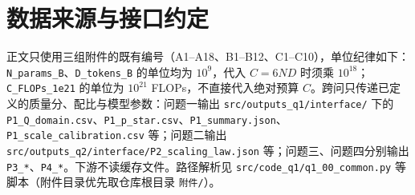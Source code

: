 \section{数据来源与接口约定}
\label{sec:5.1}

正文只使用三组附件的既有编号（A1–A18、B1–B12、C1–C10），单位纪律如下：\texttt{N\_params\_B}、\texttt{D\_tokens\_B} 的单位均为 $10^9$，代入 $C=6ND$ 时须乘 $10^{18}$；\texttt{C\_FLOPs\_1e21} 的单位为 $10^{21}$ FLOPs，不直接代入绝对预算 $C$。跨问只传递已定义的质量分、配比与模型参数：问题一输出 \texttt{src/outputs\_q1/interface/} 下的 \texttt{P1\_Q\_domain.csv}、\texttt{P1\_p\_star.csv}、\texttt{P1\_summary.json}、\texttt{P1\_scale\_calibration.csv} 等；问题二输出 \texttt{src/outputs\_q2/interface/P2\_scaling\_law.json} 等；问题三、问题四分别输出 \texttt{P3\_*}、\texttt{P4\_*}。下游不读缓存文件。路径解析见 \texttt{src/code\_q1/q1\_00\_common.py} 等脚本（附件目录优先取仓库根目录 \texttt{附件/}）。

